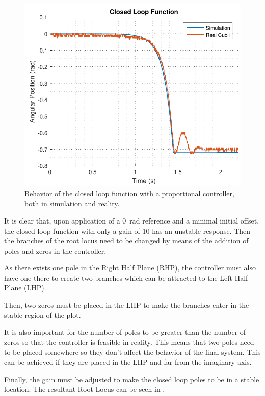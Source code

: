 \begin{figure}[H] 
	\centering 
	\includegraphics[scale=0.75]{figures/closedLoopResponse}	
	\caption{Behavior of the closed loop function with a proportional controller, both in simulation and reality.}
	\label{closedLoopResponse}
\end{figure}\vspace{-18pt}
It is clear that, upon application of a \SI{0}{rad} reference and a minimal initial offset, the closed loop function with only a gain of 10 has an unstable response. Then the branches of the root locus need to be changed by means of the addition of poles and zeros in the controller.

As there exists one pole in the Right Half Plane (RHP), the controller must also have one there to create two branches which can be attracted to the Left Half Plane (LHP).

Then, two zeros must be placed in the LHP to make the branches enter in the stable region of the plot.

It is also important for the number of poles to be greater than the number of zeros so that the controller is feasible in reality. This means that two poles need to be placed somewhere so they don't affect the behavior of the final system. This can be achieved if they are placed in the LHP and far from the imaginary axis.

Finally, the gain must be adjusted to make the closed loop poles to be in a stable location. The resultant Root Locus can be seen in .

